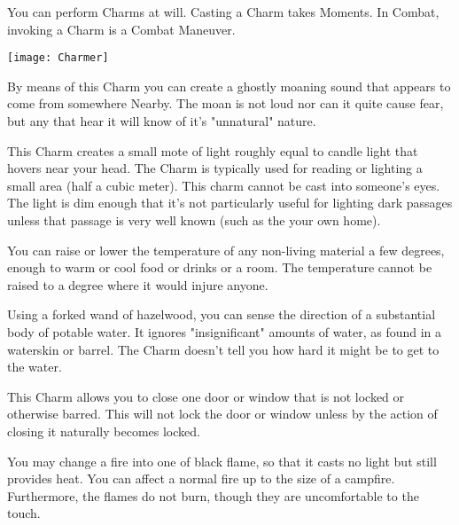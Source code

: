 
  You can perform Charms at will.  Casting a Charm takes Moments.  In Combat, invoking a Charm is a Combat Maneuver.

  \begin{center}
  \texttt{[image: Charmer]}
  \end{center}


  \cbreak



  By means of this Charm you can create a ghostly moaning sound that appears to come from somewhere Nearby. The moan is not loud nor can it quite cause fear, but any that hear it will know of it's "unnatural" nature. 


  This Charm creates a small mote of light roughly equal to candle light that hovers near your head. The Charm is typically used for reading or lighting a small area (half a cubic meter). This charm cannot be cast into someone's eyes. The light is dim enough that it's not particularly useful for lighting dark passages unless that passage is very well known (such as the your own home). 


  You can raise or lower the temperature of any non-living material a few degrees, enough to warm or cool food or drinks or a room.  The temperature cannot be raised to a degree where it would injure anyone.



  Using a forked wand of hazelwood, you can sense the direction of a substantial body of potable water.  It ignores "insignificant" amounts of water, as found in a waterskin or barrel.  The Charm doesn’t tell you how hard it might be to get to the water.


  This Charm allows you to close one door or window that is not locked or otherwise barred. This will not lock the door or window unless by the action of closing it naturally becomes locked. 


  You may change a fire into one of black flame, so that it casts no light but still provides heat.  You can affect a normal fire up to the size of a campfire.  Furthermore, the flames do not burn, though they are uncomfortable to the touch.

